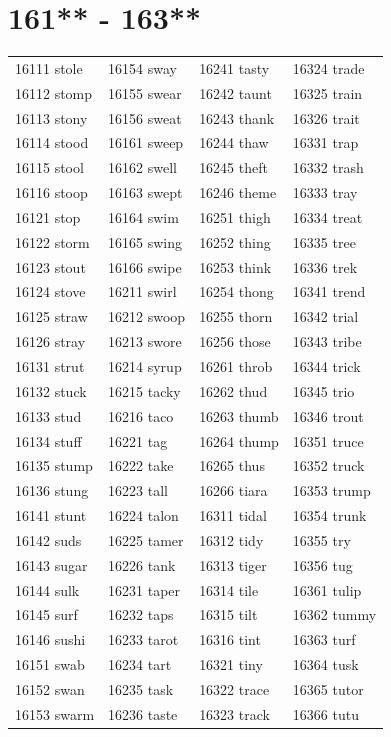 \documentclass[10pt, oneside]{book}
\begin{document}
\begin{table}
	\centering
	\section*{161** - 163**}
	\begin{tabular}{l l l l}
16111 stole &16154 sway &16241 tasty &16324 trade\\
16112 stomp &16155 swear &16242 taunt &16325 train\\
16113 stony &16156 sweat &16243 thank &16326 trait\\
16114 stood &16161 sweep &16244 thaw &16331 trap\\
16115 stool &16162 swell &16245 theft &16332 trash\\
16116 stoop &16163 swept &16246 theme &16333 tray\\
16121 stop &16164 swim &16251 thigh &16334 treat\\
16122 storm &16165 swing &16252 thing &16335 tree\\
16123 stout &16166 swipe &16253 think &16336 trek\\
16124 stove &16211 swirl &16254 thong &16341 trend\\
16125 straw &16212 swoop &16255 thorn &16342 trial\\
16126 stray &16213 swore &16256 those &16343 tribe\\
16131 strut &16214 syrup &16261 throb &16344 trick\\
16132 stuck &16215 tacky &16262 thud &16345 trio\\
16133 stud &16216 taco &16263 thumb &16346 trout\\
16134 stuff &16221 tag &16264 thump &16351 truce\\
16135 stump &16222 take &16265 thus &16352 truck\\
16136 stung &16223 tall &16266 tiara &16353 trump\\
16141 stunt &16224 talon &16311 tidal &16354 trunk\\
16142 suds &16225 tamer &16312 tidy &16355 try\\
16143 sugar &16226 tank &16313 tiger &16356 tug\\
16144 sulk &16231 taper &16314 tile &16361 tulip\\
16145 surf &16232 taps &16315 tilt &16362 tummy\\
16146 sushi &16233 tarot &16316 tint &16363 turf\\
16151 swab &16234 tart &16321 tiny &16364 tusk\\
16152 swan &16235 task &16322 trace &16365 tutor\\
16153 swarm &16236 taste &16323 track &16366 tutu\\
	\end{tabular}
 \end{table}
\clearpage
\end{document}
